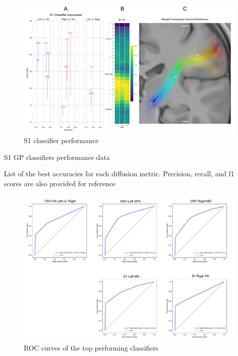 \begin{figure}[ht]
\centering
\includegraphics[width=\linewidth]{figure-GP-S1.pdf}
\caption{S1 classifier performance}
\label{fig:GPfigure5}
\end{figure}

\begin{table}[ht]
\centering
{}
\caption{S1 GP classifiers performance data}
\caption*{List of the best accuracies for each diffusion metric. Precision, recall, and f1 scores are also provided for reference}
\label{table:s1}
\end{table}

\begin{figure}[ht]
\centering
\includegraphics[width=\linewidth]{figure-roc.pdf}
\caption{ROC curves of the top performing classifiers}
\label{fig:GPfigure6}
\end{figure}

